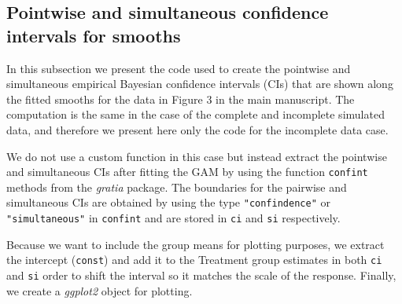 \documentclass[
]{article}
\newcommand{\passthrough}[1]{#1}
\begin{document}
\hypertarget{pointwise-and-simultaneous-confidence-intervals-for-smooths}{%
\subsection{Pointwise and simultaneous confidence intervals for smooths}\label{pointwise-and-simultaneous-confidence-intervals-for-smooths}}

In this subsection we present the code used to create the pointwise and simultaneous empirical Bayesian confidence intervals (CIs) that are shown along the fitted smooths for the data in Figure 3 in the main manuscript. The computation is the same in the case of the complete and incomplete simulated data, and therefore we present here only the code for the incomplete data case.

We do not use a custom function in this case but instead extract the pointwise and simultaneous CIs after fitting the GAM by using the function \passthrough{\lstinline!confint!} methods from the \emph{gratia} package. The boundaries for the pairwise and simultaneous CIs are obtained by using the type \passthrough{\lstinline!"confindence"!} or \passthrough{\lstinline!"simultaneous"!} in \passthrough{\lstinline!confint!} and are stored in \passthrough{\lstinline!ci!} and \passthrough{\lstinline!si!} respectively.

Because we want to include the group means for plotting purposes, we extract the intercept (\passthrough{\lstinline!const!}) and add it to the Treatment group estimates in both \passthrough{\lstinline!ci!} and \passthrough{\lstinline!si!} order to shift the interval so it matches the scale of the response. Finally, we create a \emph{ggplot2} object for plotting.
\end{document}
